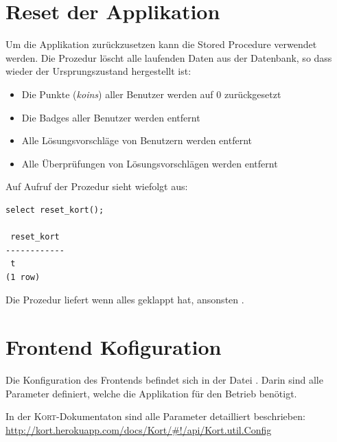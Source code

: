 \section{Reset der Applikation}
\label{kort-reset}
Um die Applikation zurückzusetzen kann die Stored Procedure  verwendet werden. 
Die Prozedur löscht alle laufenden Daten aus der Datenbank, so dass wieder der Ursprungszustand hergestellt ist:
\begin{itemize}
\item Die Punkte (\emph{\gls{koins}}) aller Benutzer werden auf 0 zurückgesetzt
\item Die \gls{Badge}s aller Benutzer werden entfernt
\item Alle Lösungsvorschläge von Benutzern werden entfernt
\item Alle Überprüfungen von Lösungsvorschlägen werden entfernt
\end{itemize}

Auf Aufruf der Prozedur sieht wiefolgt aus:
\begin{lstlisting}[float, caption=Aufruf von reset\_kort() um die Applikation zurückzusetzen, label=kort-reset-cmd]
select reset_kort();

 reset_kort 
------------
 t
(1 row)
\end{lstlisting}

Die Prozedur liefert  wenn alles geklappt hat, ansonsten .

\section{Frontend Kofiguration}
\label{frontend-config}
Die Konfiguration des Frontends befindet sich in der Datei .
Darin sind alle Parameter definiert, welche die Applikation für den Betrieb benötigt.

In der \textsc{Kort}-Dokumentaton sind alle Parameter detailliert beschrieben: \url{http://kort.herokuapp.com/docs/Kort/#!/api/Kort.util.Config}